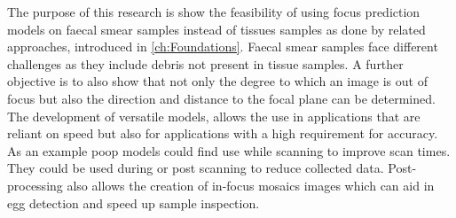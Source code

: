 The purpose of this research is show the feasibility of using focus prediction models on faecal smear samples instead of tissues samples as done by related approaches, introduced in \autoref{ch:Foundations}. Faecal smear samples face different challenges as they include debris not present in tissue samples.
A further objective is to also show that not only the degree to which an image is out of focus but also the direction and distance to the focal plane can be determined. The development of versatile models, allows the use in applications that are reliant on speed but also for applications with a high requirement for accuracy. As an example \ac{poop} models could find use while scanning to improve scan times. They could be used during or post scanning to reduce collected data. Post-processing also allows the creation of in-focus mosaics images which can aid in egg detection and speed up sample inspection.
